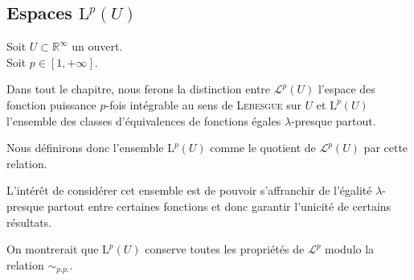 \documentclass[../distribution.tex]{subfiles}
\begin{document}
	\subsection{Espaces \texorpdfstring{$\mathrm{L}^{p}(U)$}{Lp(U)}}{
		\noindent Soit $U \subset \mathbb{R}^{\infty}$ un ouvert. \\
		\noindent Soit $p \in [1, +\infty]$.

		\vspace{1em}

		Dans tout le chapitre, nous ferons la distinction entre $\mathcal{L}^{p}(U)$ l'espace des fonction puissance $p$-fois intégrable au sens de \textsc{Lebesgue} sur $U$ et $\mathrm{L}^{p}(U)$ l'ensemble des classes d'équivalences de fonctions égales $\lambda$-presque partout.


		Nous définirons donc l'ensemble $\mathrm{L}^{p}(U)$ comme le quotient de $\mathcal{L}^{p}(U)$ par cette relation.


		L'intérêt de considérer cet ensemble est de pouvoir s'affranchir de l'égalité $\lambda$-presque partout entre certaines fonctions et donc garantir l'unicité de certains résultats.

		On montrerait que $\mathrm{L}^{p}(U)$ conserve toutes les propriétés de $\mathcal{L}^{p}$ modulo la relation $\sim_{p.p.}$.
	}
\end{document}
